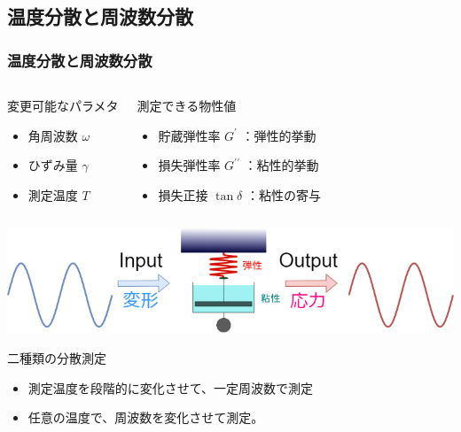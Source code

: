 \documentclass[12pt, dvipdfmx]{beamer}
\begin{document}
\subsection{温度分散と周波数分散}
\begin{frame}
	\frametitle{温度分散と周波数分散}
		\vspace{-5mm}
	\begin{columns}[T, onlytextwidth]
			\begin{exampleblock}{変更可能なパラメタ}
				\begin{itemize}
				\item 角周波数 $\omega$
				\item ひずみ量 $\gamma$
				\item 測定温度 $T$
				\end{itemize}
			\end{exampleblock}
			\begin{block}{測定できる物性値}
				\begin{itemize}
				\item 貯蔵弾性率 $G^{\prime}$ ：弾性的挙動
				\item 損失弾性率 $G^{\prime \prime}$ ：粘性的挙動
				\item 損失正接 $\tan \delta$ ：粘性の寄与
				\end{itemize}
			\end{block}
	\end{columns}

		\vspace{3mm}
			\centering
				\includegraphics[width=.9\textwidth]{dynamic_ViscoElast_2.png}
		
	\begin{alertblock}{二種類の分散測定}
		\begin{itemize}
			\item 測定温度を段階的に変化させて、一定周波数で測定
			\item 任意の温度で、周波数を変化させて測定。
		\end{itemize}
	\end{alertblock}
\end{frame}
\end{document}

